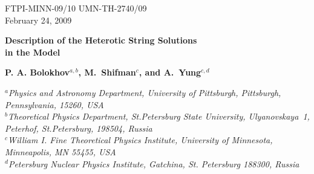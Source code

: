 \documentclass[12pt]{article}
\begin{document}
\begin{titlepage}

\begin{flushright}
FTPI-MINN-09/10 UMN-TH-2740/09\\
February 24, 2009
\end{flushright}

\begin{center}

{\Large \bf   Description of the Heterotic String Solutions
\\[2mm]
 in the  Model }
\end{center}

\begin{center}
{\bf P. A. Bolokhov$^{a,b}$, M.~Shifman$^{c}$, and \bf A.~Yung$^{c,d}$}
\end {center}
\vspace{0.3cm}
\begin{center}

$^a${\it Physics and Astronomy Department, University of Pittsburgh, Pittsburgh, Pennsylvania, 15260, USA}\\
$^b${\it Theoretical Physics Department, St.Petersburg State University, Ulyanovskaya~1, 
	 Peterhof, St.Petersburg, 198504, Russia}\\
$^c${\it  William I. Fine Theoretical Physics Institute,
University of Minnesota,
Minneapolis, MN 55455, USA}\\
$^{d}${\it Petersburg Nuclear Physics Institute, Gatchina, St. Petersburg
188300, Russia}\\
\end{center}

\begin{abstract}


\end{abstract}
\end{titlepage}
\end{document}
